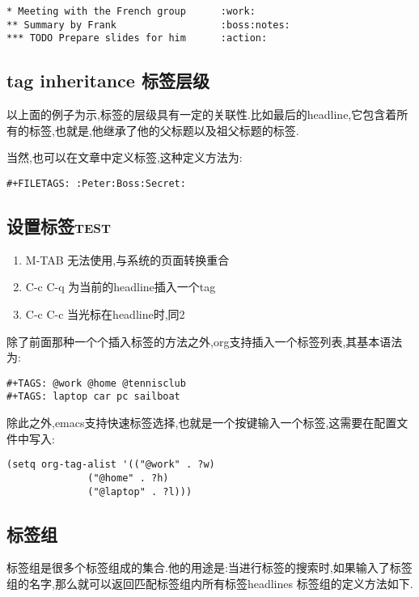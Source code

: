 \documentclass[10pt,a4paper]{article}
\begin{document}
\begin{verbatim}
* Meeting with the French group      :work:
** Summary by Frank                  :boss:notes:
*** TODO Prepare slides for him      :action:
\end{verbatim}

\subsection{tag inheritance 标签层级}
\label{sec:org6db5e86}
以上面的例子为示,标签的层级具有一定的关联性.比如最后的headline,它包含着所有的标签,也就是,他继承了他的父标题以及祖父标题的标签.

当然,也可以在文章中定义标签,这种定义方法为:

\begin{verbatim}
#+FILETAGS: :Peter:Boss:Secret:
\end{verbatim}

\subsection{设置标签\hfill{}\textsc{test}}
\label{sec:org16722eb}
\begin{enumerate}
\item M-TAB 无法使用,与系统的页面转换重合
\item C-c C-q 为当前的headline插入一个tag
\item C-c C-c 当光标在headline时,同2
\end{enumerate}

除了前面那种一个个插入标签的方法之外,org支持插入一个标签列表,其基本语法为:

\begin{verbatim}
#+TAGS: @work @home @tennisclub
#+TAGS: laptop car pc sailboat

\end{verbatim}

除此之外,emacs支持快速标签选择,也就是一个按键输入一个标签,这需要在配置文件中写入:

\begin{verbatim}
(setq org-tag-alist '(("@work" . ?w)
		      ("@home" . ?h)
		      ("@laptop" . ?l)))
\end{verbatim}

\subsection{标签组}
\label{sec:org4284b6f}
标签组是很多个标签组成的集合.他的用途是:当进行标签的搜索时,如果输入了标签组的名字,那么就可以返回匹配标签组内所有标签headlines
标签组的定义方法如下.
\end{document}
